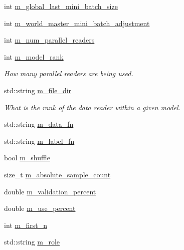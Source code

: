 \begin{DoxyCompactItemize}
int \hyperlink{classlbann_1_1generic__data__reader_a1d6f2d378a3f152e20b3def16f52c003}{m\+\_\+global\+\_\+last\+\_\+mini\+\_\+batch\+\_\+size}
\item 
int \hyperlink{classlbann_1_1generic__data__reader_acd33b2dbdfd4043ecc62cc13789532a2}{m\+\_\+world\+\_\+master\+\_\+mini\+\_\+batch\+\_\+adjustment}
\item 
int \hyperlink{classlbann_1_1generic__data__reader_a6eb9b8c7c704374a1e49dce87110455e}{m\+\_\+num\+\_\+parallel\+\_\+readers}
\item 
int \hyperlink{classlbann_1_1generic__data__reader_a5e89d5e6797f7e7b69d1a64f7d8b5d6b}{m\+\_\+model\+\_\+rank}
\begin{DoxyCompactList}\small\item\em How many parallel readers are being used. \end{DoxyCompactList}\item 
std\+::string \hyperlink{classlbann_1_1generic__data__reader_a252002ec211d67606b80bc481a27e820}{m\+\_\+file\+\_\+dir}
\begin{DoxyCompactList}\small\item\em What is the rank of the data reader within a given model. \end{DoxyCompactList}\item 
std\+::string \hyperlink{classlbann_1_1generic__data__reader_a2595e254ab2442e8cfc80aa6bdac0c0f}{m\+\_\+data\+\_\+fn}
\item 
std\+::string \hyperlink{classlbann_1_1generic__data__reader_a492d45c107df31b3e241e54d51950746}{m\+\_\+label\+\_\+fn}
\item 
bool \hyperlink{classlbann_1_1generic__data__reader_a8039ed9c12a5847f0dcf7dd54b8d2f5b}{m\+\_\+shuffle}
\item 
size\+\_\+t \hyperlink{classlbann_1_1generic__data__reader_a462437ed899bc26ebec9ab2091980d0c}{m\+\_\+absolute\+\_\+sample\+\_\+count}
\item 
double \hyperlink{classlbann_1_1generic__data__reader_a3e4afbe28634a913f6de9daabf05dc0d}{m\+\_\+validation\+\_\+percent}
\item 
double \hyperlink{classlbann_1_1generic__data__reader_a8b475834bd80e7103c3631d2b061aabc}{m\+\_\+use\+\_\+percent}
\item 
int \hyperlink{classlbann_1_1generic__data__reader_a51af253029b7daea29bc46cbbef686b3}{m\+\_\+first\+\_\+n}
\item 
std\+::string \hyperlink{classlbann_1_1generic__data__reader_a2f311e8c91be2a7ac93f6f141bb714a1}{m\+\_\+role}
\item 

\end{DoxyCompactItemize}
